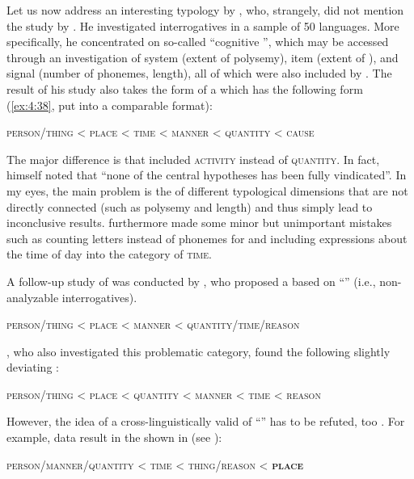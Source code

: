 Let us now address an interesting typology by \citet{Mackenzie2009}, who, strangely, did not mention the study by \citet{Heine1991}. He investigated interrogatives in a sample of 50 languages. More specifically, he concentrated on so-called “cognitive ”, which may be accessed through an investigation of system  (extent of polysemy), item  (extent of ), and signal  (number of phonemes, length), all of which were also included by \citet{Heine1991}. The result of his study also takes the form of a  which has the following form (\ref{ex:4:38}, put into a comparable format):

\ea\upshape%
    \label{ex:4:38}
    \textsc{person/thing < place < time < manner < quantity < cause}
    \z

\noindent The major difference is that \citet{Heine1991} included \textsc{activity} instead of \textsc{quantity}. In fact, \citet[1150]{Mackenzie2009} himself noted that “none of the central hypotheses has been fully vindicated”. In my eyes, the main problem is the  of different typological dimensions that are not directly connected (such as polysemy and length) and thus simply lead to inconclusive results. \citet{Mackenzie2009} furthermore made some minor but unimportant mistakes such as counting letters instead of phonemes for  and including expressions about the time of day into the category of \textsc{time}.

A follow-up study of \citet{Mackenzie2009} was conducted by \citet{Hengeveld2012}, who proposed a  based on “” (i.e., non-analyzable interrogatives).

\ea\upshape%
    \label{ex:4:39}
    \textsc{person/thing < place < manner < quantity/time/reason}
    \z

\noindent \citet{Mackenzie2009}, who also investigated this problematic category, found the following slightly deviating :

\ea\upshape%
    \label{ex:4:40}
    \textsc{person/thing < place < quantity < manner < time < reason}
    \z

However, the idea of a cross-linguistically valid  of “” has to be refuted, too \citep{Hölzl2015c}. For example,  data result in the  shown in  (see ):

\ea\upshape%
    \label{ex:4:41}
    \textsc{person/manner/quantity < time < thing/reason <} \textbf{\textsc{place}}
    \z

